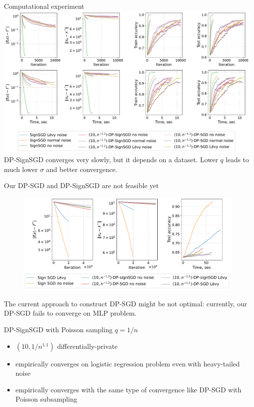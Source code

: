 \documentclass{beamer}
\begin{document}
\begin{frame}{Computational experiment}
    \includegraphics[width=1.0\textwidth]{v28_constant_step/long/v28_constant_step_long.pdf} 
DP-SignSGD converges very slowly, but it depends on a dataset. Lower $q$ leads to much lower $\sigma$ and better convergence.
\end{frame}
\begin{frame}{Our DP-SGD and DP-SignSGD are not feasible yet}
    \begin{figure}
        \centering
        \includegraphics[width=1\textwidth]{v28_10eps_short.pdf}
    \end{figure}
    The current approach to construct DP-SGD might be not optimal: currently, our DP-SGD fails to converge on MLP problem.
\end{frame}
\begin{frame}{DP-SignSGD with Poisson sampling $q = 1/n$}
    \begin{itemize}
        \item $(10, 1/n^{1.1})$ differentially-private
        \item empirically converges on logistic regression problem even with heavy-tailed noise
        \item empirically converges with the same type of convergence like DP-SGD with Poisson subsampling
    \end{itemize}
\end{frame}
\end{document}
